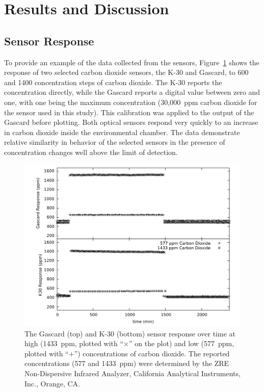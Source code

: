 \documentclass[times]{joehreview}
\begin{document}
	\section*{Results and Discussion}
	
	\subsection*{Sensor Response}
	\label{sec:time}
	
	To provide an example of the data collected from the sensors, Figure~\ref{fig:peakdetailco2} shows the response of two selected carbon dioxide sensors, the K-30 and Gascard, to 600 and 1400 concentration steps of carbon dioxide.  The K-30 reports the concentration directly, while the Gascard reports a digital value between zero and one, with one being the maximum concentration (30,000~ppm carbon dioxide for the sensor used in this study).  This calibration was applied to the output of the Gascard before plotting. Both optical sensors respond very quickly to an increase in carbon dioxide inside the environmental chamber.  The data demonstrate relative similarity in behavior of the selected sensors in the presence of concentration changes well above the limit of detection.  
	
	\begin{figure}[!t]
		\centering
		\includegraphics[width=\columnwidth]{honey3.pdf}
		\caption{The Gascard (top) and K-30 (bottom) sensor response over time at high (1433~ppm, plotted with ``$\times$'' on the plot) and low (577~ppm, plotted with ``$+$'') concentrations of carbon dioxide.  The reported concentrations (577 and 1433~ppm) were determined by the ZRE Non-Dispersive Infrared Analyzer, California Analytical Instruments, Inc., Orange, CA.}
		\label{fig:peakdetailco2}
	\end{figure}
	
\end{document}
